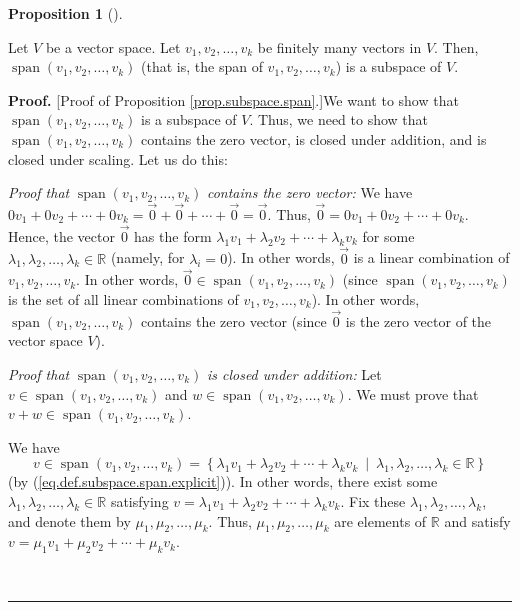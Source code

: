 \documentclass[numbers=enddot,12pt,final,onecolumn,notitlepage]{scrartcl}%
\theoremstyle{definition}
\newtheorem{prop}[theo]{Proposition}
\newenvironment{proposition}[1][]
{\begin{prop}[#1]\begin{leftbar}}
{\end{leftbar}\end{prop}}
\newenvironment{proof}[1][Proof]{\noindent\textbf{#1.} }{\ \rule{0.5em}{0.5em}}
\begin{document}
\begin{proposition}
\label{prop.subspace.span}Let $V$ be a vector space. Let $v_{1},v_{2}%
,\ldots,v_{k}$ be finitely many vectors in $V$. Then, $\operatorname{span}%
\left(  v_{1},v_{2},\ldots,v_{k}\right)  $ (that is, the span of $v_{1}%
,v_{2},\ldots,v_{k}$) is a subspace of $V$.
\end{proposition}

\begin{proof}
[Proof of Proposition \ref{prop.subspace.span}.]We want to show that
$\operatorname{span}\left(  v_{1},v_{2},\ldots,v_{k}\right)  $ is a subspace
of $V$. Thus, we need to show that $\operatorname{span}\left(  v_{1}%
,v_{2},\ldots,v_{k}\right)  $ contains the zero vector, is closed under
addition, and is closed under scaling. Let us do this:

\textit{Proof that }$\operatorname{span}\left(  v_{1},v_{2},\ldots
,v_{k}\right)  $\textit{ contains the zero vector:} We have $0v_{1}%
+0v_{2}+\cdots+0v_{k}=\overrightarrow{0}+\overrightarrow{0}+\cdots
+\overrightarrow{0}=\overrightarrow{0}$. Thus, $\overrightarrow{0}%
=0v_{1}+0v_{2}+\cdots+0v_{k}$. Hence, the vector $\overrightarrow{0}$ has the
form $\lambda_{1}v_{1}+\lambda_{2}v_{2}+\cdots+\lambda_{k}v_{k}$ for some
$\lambda_{1},\lambda_{2},\ldots,\lambda_{k}\in\mathbb{R}$ (namely, for
$\lambda_{i}=0$). In other words, $\overrightarrow{0}$ is a linear combination
of $v_{1},v_{2},\ldots,v_{k}$. In other words, $\overrightarrow{0}%
\in\operatorname{span}\left(  v_{1},v_{2},\ldots,v_{k}\right)  $ (since
$\operatorname{span}\left(  v_{1},v_{2},\ldots,v_{k}\right)  $ is the set of
all linear combinations of $v_{1},v_{2},\ldots,v_{k}$). In other words,
$\operatorname{span}\left(  v_{1},v_{2},\ldots,v_{k}\right)  $ contains the
zero vector (since $\overrightarrow{0}$ is the zero vector of the vector space
$V$).

\textit{Proof that }$\operatorname{span}\left(  v_{1},v_{2},\ldots
,v_{k}\right)  $ \textit{is closed under addition:} Let $v\in
\operatorname{span}\left(  v_{1},v_{2},\ldots,v_{k}\right)  $ and
$w\in\operatorname{span}\left(  v_{1},v_{2},\ldots,v_{k}\right)  $. We must
prove that $v+w\in\operatorname{span}\left(  v_{1},v_{2},\ldots,v_{k}\right)
$.

We have
\[
v\in\operatorname{span}\left(  v_{1},v_{2},\ldots,v_{k}\right)  =\left\{
\lambda_{1}v_{1}+\lambda_{2}v_{2}+\cdots+\lambda_{k}v_{k}\ \mid\ \lambda
_{1},\lambda_{2},\ldots,\lambda_{k}\in\mathbb{R}\right\}
\]
(by (\ref{eq.def.subspace.span.explicit})). In other words, there exist some
$\lambda_{1},\lambda_{2},\ldots,\lambda_{k}\in\mathbb{R}$ satisfying
$v=\lambda_{1}v_{1}+\lambda_{2}v_{2}+\cdots+\lambda_{k}v_{k}$. Fix these
$\lambda_{1},\lambda_{2},\ldots,\lambda_{k}$, and denote them by $\mu_{1}%
,\mu_{2},\ldots,\mu_{k}$. Thus, $\mu_{1},\mu_{2},\ldots,\mu_{k}$ are elements
of $\mathbb{R}$ and satisfy $v=\mu_{1}v_{1}+\mu_{2}v_{2}+\cdots+\mu_{k}v_{k}$.


\end{proof}
\end{document}
